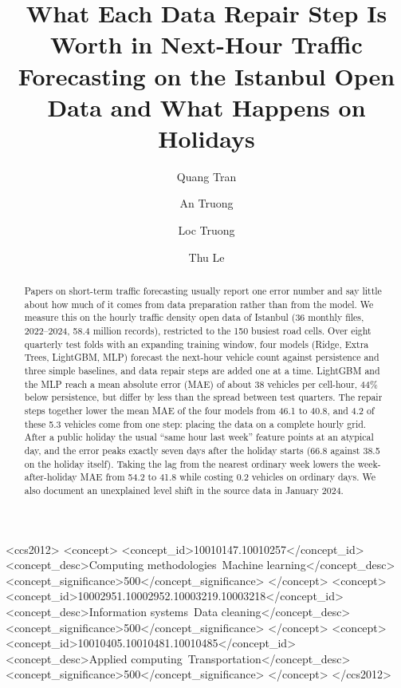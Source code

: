 \documentclass[sigconf]{acmart}
\begin{document}
\title[Data Repair Steps in Next-Hour Traffic Forecasting]{What Each Data Repair Step Is Worth in Next-Hour Traffic Forecasting on the Istanbul Open Data and What Happens on Holidays}

\author{Quang Tran}

\author{An Truong}

\author{Loc Truong}

\author{Thu Le}

\begin{abstract}
Papers on short-term traffic forecasting usually report one error number and say little about how much of it comes from data preparation rather than from the model. We measure this on the hourly traffic density open data of Istanbul (36 monthly files, 2022--2024, 58.4 million records), restricted to the 150 busiest road cells. Over eight quarterly test folds with an expanding training window, four models (Ridge, Extra Trees, LightGBM, MLP) forecast the next-hour vehicle count against persistence and three simple baselines, and data repair steps are added one at a time. LightGBM and the MLP reach a mean absolute error (MAE) of about 38 vehicles per cell-hour, 44\% below persistence, but differ by less than the spread between test quarters. The repair steps together lower the mean MAE of the four models from 46.1 to 40.8, and 4.2 of these 5.3 vehicles come from one step: placing the data on a complete hourly grid. After a public holiday the usual ``same hour last week'' feature points at an atypical day, and the error peaks exactly seven days after the holiday starts (66.8 against 38.5 on the holiday itself). Taking the lag from the nearest ordinary week lowers the week-after-holiday MAE from 54.2 to 41.8 while costing 0.2 vehicles on ordinary days. We also document an unexplained level shift in the source data in January 2024.
\end{abstract}

\begin{CCSXML}
<ccs2012>
<concept>
<concept_id>10010147.10010257</concept_id>
<concept_desc>Computing methodologies~Machine learning</concept_desc>
<concept_significance>500</concept_significance>
</concept>
<concept>
<concept_id>10002951.10002952.10003219.10003218</concept_id>
<concept_desc>Information systems~Data cleaning</concept_desc>
<concept_significance>500</concept_significance>
</concept>
<concept>
<concept_id>10010405.10010481.10010485</concept_id>
<concept_desc>Applied computing~Transportation</concept_desc>
<concept_significance>500</concept_significance>
</concept>
</ccs2012>
\end{CCSXML}
\end{document}
